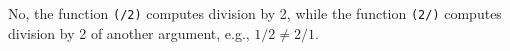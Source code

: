 
 No, the function \verb|(/2)| computes division by 2, while the function \verb|(2/)|
 computes division by 2 of another argument, e.g., $1/2 \neq 2/1$.
